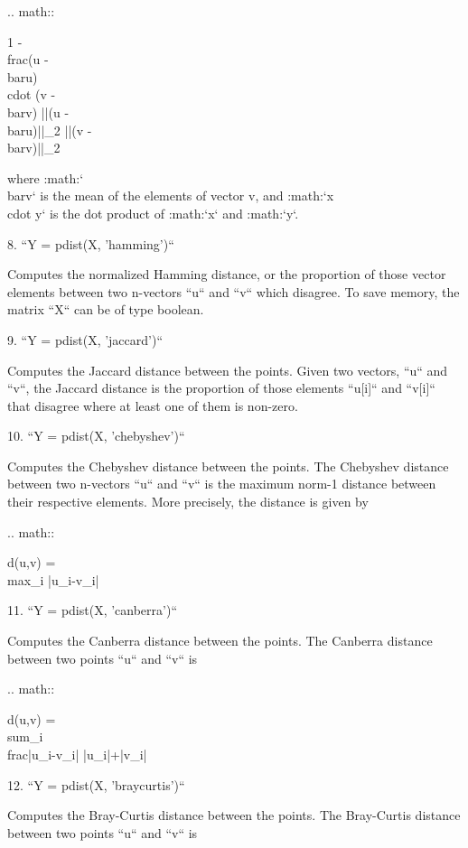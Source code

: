 \begin{DoxyVerb}
   .. math::

      1 - \\frac{(u - \\bar{u}) \\cdot (v - \\bar{v})}
               {{||(u - \\bar{u})||}_2 {||(v - \\bar{v})||}_2}

   where :math:`\\bar{v}` is the mean of the elements of vector v,
   and :math:`x \\cdot y` is the dot product of :math:`x` and :math:`y`.

8. ``Y = pdist(X, 'hamming')``

   Computes the normalized Hamming distance, or the proportion of
   those vector elements between two n-vectors ``u`` and ``v``
   which disagree. To save memory, the matrix ``X`` can be of type
   boolean.

9. ``Y = pdist(X, 'jaccard')``

   Computes the Jaccard distance between the points. Given two
   vectors, ``u`` and ``v``, the Jaccard distance is the
   proportion of those elements ``u[i]`` and ``v[i]`` that
   disagree where at least one of them is non-zero.

10. ``Y = pdist(X, 'chebyshev')``

   Computes the Chebyshev distance between the points. The
   Chebyshev distance between two n-vectors ``u`` and ``v`` is the
   maximum norm-1 distance between their respective elements. More
   precisely, the distance is given by

   .. math::

      d(u,v) = \\max_i {|u_i-v_i|}

11. ``Y = pdist(X, 'canberra')``

   Computes the Canberra distance between the points. The
   Canberra distance between two points ``u`` and ``v`` is

   .. math::

     d(u,v) = \\sum_i \\frac{|u_i-v_i|}
                          {|u_i|+|v_i|}


12. ``Y = pdist(X, 'braycurtis')``

   Computes the Bray-Curtis distance between the points. The
   Bray-Curtis distance between two points ``u`` and ``v`` is



\end{DoxyVerb}
